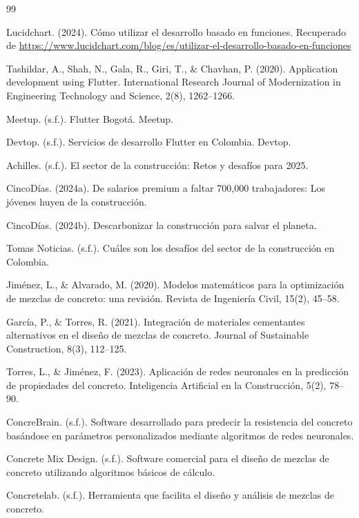 \documentclass[12pt, letterpaper]{article}
\begin{document}
\begin{thebibliography}{99}

Lucidchart. (2024). Cómo utilizar el desarrollo basado en funciones. Recuperado de \url{https://www.lucidchart.com/blog/es/utilizar-el-desarrollo-basado-en-funciones}

Tashildar, A., Shah, N., Gala, R., Giri, T., \& Chavhan, P. (2020).
Application development using Flutter.
International Research Journal of Modernization in Engineering Technology and Science, 2(8), 1262--1266.

Meetup. (s.f.). Flutter Bogotá. Meetup.

Devtop. (s.f.). Servicios de desarrollo Flutter en Colombia. Devtop.

Achilles. (s.f.). El sector de la construcción: Retos y desafíos para 2025.

CincoDías. (2024a). De salarios premium a faltar 700{,}000 trabajadores: Los jóvenes huyen de la construcción.

CincoDías. (2024b). Descarbonizar la construcción para salvar el planeta.

Tomas Noticias. (s.f.). Cuáles son los desafíos del sector de la construcción en Colombia.

Jiménez, L., \& Alvarado, M. (2020).
Modelos matemáticos para la optimización de mezclas de concreto: una revisión.
Revista de Ingeniería Civil, 15(2), 45--58.

García, P., \& Torres, R. (2021).
Integración de materiales cementantes alternativos en el diseño de mezclas de concreto.
Journal of Sustainable Construction, 8(3), 112--125.

Torres, L., \& Jiménez, F. (2023).
Aplicación de redes neuronales en la predicción de propiedades del concreto.
Inteligencia Artificial en la Construcción, 5(2), 78--90.

ConcreBrain. (s.f.). Software desarrollado para predecir la resistencia del concreto basándose en parámetros personalizados mediante algoritmos de redes neuronales.

Concrete Mix Design. (s.f.). Software comercial para el diseño de mezclas de concreto utilizando algoritmos básicos de cálculo.

Concretelab. (s.f.). Herramienta que facilita el diseño y análisis de mezclas de concreto.


\end{thebibliography}
\end{document}
